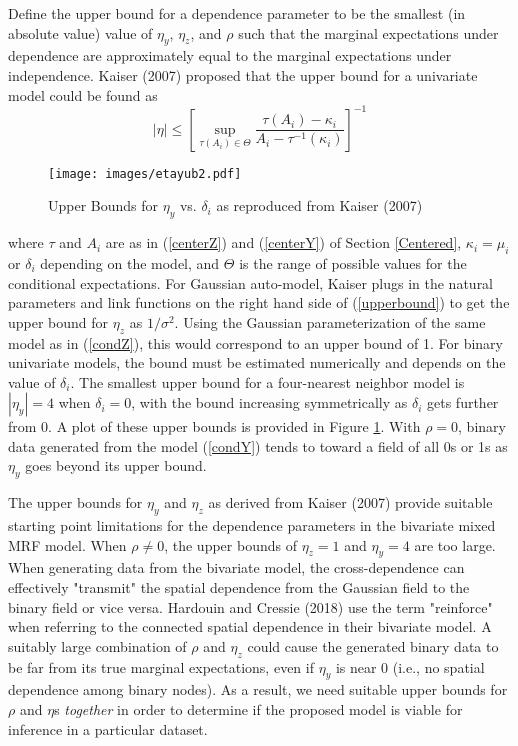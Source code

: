 \documentclass[12pt, a4paper, twoside]{article}
\begin{document}
Define the upper bound for a dependence parameter to be the smallest (in absolute value) value of $\eta_y$, $\eta_z$, and $\rho$ such that the marginal expectations under dependence are approximately equal to the marginal expectations under independence. Kaiser (2007) proposed that the upper bound for a univariate model could be found as
\begin{equation} \label{upperbound}
|\eta| \leq \left\lbrack \sup_{\tau(A_i)\in\Theta}\frac{\tau(A_i) - \kappa_i}{A_i - \tau^{-1}(\kappa_i)} \right\rbrack^{-1}
\end{equation}
\begin{figure}[t]
	\centering
	\texttt{[image: images/etayub2.pdf]}
	\caption[Standard Upper Bounds for Autologistic Dependence Parameter]{Upper Bounds for $\eta_y$ vs. $\delta_i$ as reproduced from Kaiser (2007)}
	\label{etaUB}
\end{figure}
where $\tau$ and $A_i$ are as in (\ref{centerZ}) and (\ref{centerY}) of Section \ref{Centered},  $\kappa_i = \mu_i$ or $\delta_i$ depending on the model, and $\Theta$ is the range of possible values for the conditional expectations. For Gaussian auto-model, Kaiser plugs in the natural parameters and link functions on the right hand side of (\ref{upperbound}) to get the upper bound for $\eta_z$ as $1/\sigma^2$. Using the Gaussian parameterization of the same model as in (\ref{condZ}), this would correspond to an upper bound of 1. For binary univariate models, the bound must be estimated numerically and depends on the value of $\delta_i$. The smallest upper bound for a four-nearest neighbor model is $|\eta_y| = 4$ when $\delta_i = 0$, with the bound increasing symmetrically as $\delta_i$ gets further from 0. A plot of these upper bounds is provided in Figure \ref{etaUB}. With $\rho=0$, binary data generated from the model (\ref{condY}) tends to toward a field of all 0s or 1s as $\eta_y$ goes beyond its upper bound.

The upper bounds for $\eta_y$ and $\eta_z$ as derived from Kaiser (2007) provide suitable starting point limitations for the dependence parameters in the bivariate mixed MRF model. When $\rho \neq 0$, the upper bounds of $\eta_z = 1$ and $\eta_y = 4$ are too large. When generating data from the bivariate model, the cross-dependence can effectively "transmit" the spatial dependence from the Gaussian field to the binary field or vice versa. Hardouin and Cressie (2018) use the term "reinforce" when referring to the connected spatial dependence in their bivariate model.  A suitably large combination of $\rho$ and $\eta_{z}$ could cause the generated binary data to be far from its true marginal expectations, even if $\eta_y$ is near 0 (i.e., no spatial dependence among binary nodes). As a result, we need suitable upper bounds for $\rho$ and $\eta$s \textit{together} in order to determine if the proposed model is viable for inference in a particular dataset.
\end{document}
